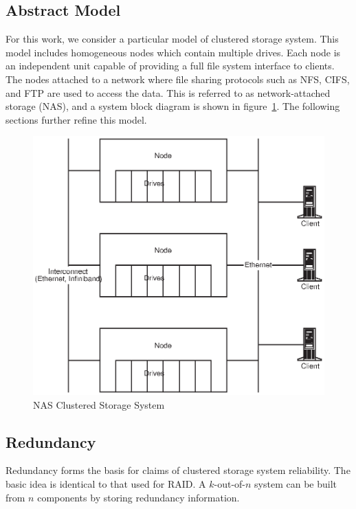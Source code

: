 \documentclass[11pt]{article}
\numberwithin{equation}{section}
\begin{document}
\subsection{Abstract Model}

For this work, we consider a particular model of clustered storage system.
This model includes homogeneous nodes which contain multiple drives.  Each
node is an independent unit capable of providing a full file system interface
to clients.  The nodes attached to a network where file sharing protocols such
as NFS, CIFS, and FTP are used to access the data.  This is referred to as
network-attached storage (NAS), and a system block diagram is shown in
figure~\ref{fig-nas-cluster}.  The following sections further refine this
model.

\begin{figure}[h]
\begin{center}
\includegraphics[width=\textwidth]{ClusterDiagram}
\end{center}
\caption{NAS Clustered Storage System}
\label{fig-nas-cluster}
\end{figure}

\subsection{Redundancy}
\label{sec-redundancy}

Redundancy forms the basis for claims of clustered storage system reliability.
The basic idea is identical to that used for RAID.  A $k$-out-of-$n$ system
can be built from $n$ components by storing redundancy information.
\end{document}
